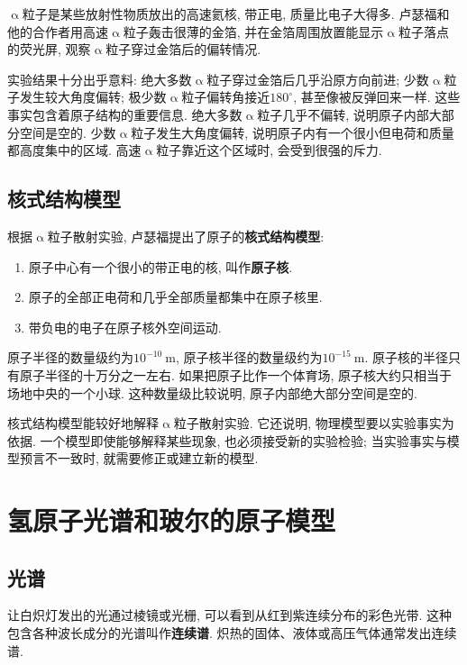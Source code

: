 \documentclass[11pt,a4paper]{ctexbook}
\newcommand{\unit}[1]{\ \mathrm{#1}}
\begin{document}
$\upalpha$粒子是某些放射性物质放出的高速氦核, 带正电, 质量比电子大得多. 卢瑟福和他的合作者用高速$\upalpha$粒子轰击很薄的金箔, 并在金箔周围放置能显示$\upalpha$粒子落点的荧光屏, 观察$\upalpha$粒子穿过金箔后的偏转情况.

实验结果十分出乎意料: 绝大多数$\upalpha$粒子穿过金箔后几乎沿原方向前进; 少数$\upalpha$粒子发生较大角度偏转; 极少数$\upalpha$粒子偏转角接近$180^\circ$, 甚至像被反弹回来一样. 这些事实包含着原子结构的重要信息. 绝大多数$\upalpha$粒子几乎不偏转, 说明原子内部大部分空间是空的. 少数$\upalpha$粒子发生大角度偏转, 说明原子内有一个很小但电荷和质量都高度集中的区域. 高速$\upalpha$粒子靠近这个区域时, 会受到很强的斥力.

\subsection{核式结构模型}

根据$\upalpha$粒子散射实验, 卢瑟福提出了原子的\textbf{核式结构模型}:

\begin{enumerate}
    \item 原子中心有一个很小的带正电的核, 叫作\textbf{原子核}.
    \item 原子的全部正电荷和几乎全部质量都集中在原子核里.
    \item 带负电的电子在原子核外空间运动.
\end{enumerate}

原子半径的数量级约为$10^{-10}\unit{m}$, 原子核半径的数量级约为$10^{-15}\unit{m}$. 原子核的半径只有原子半径的十万分之一左右. 如果把原子比作一个体育场, 原子核大约只相当于场地中央的一个小球. 这种数量级比较说明, 原子内部绝大部分空间是空的.

核式结构模型能较好地解释$\upalpha$粒子散射实验. 它还说明, 物理模型要以实验事实为依据. 一个模型即使能够解释某些现象, 也必须接受新的实验检验; 当实验事实与模型预言不一致时, 就需要修正或建立新的模型.

\section{氢原子光谱和玻尔的原子模型}

\subsection{光谱}

让白炽灯发出的光通过棱镜或光栅, 可以看到从红到紫连续分布的彩色光带. 这种包含各种波长成分的光谱叫作\textbf{连续谱}. 炽热的固体、液体或高压气体通常发出连续谱.
\end{document}
